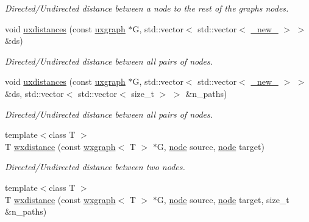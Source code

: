 \begin{DoxyCompactItemize}
\begin{DoxyCompactList}\small\item\em Directed/\+Undirected distance between a node to the rest of the graph\textquotesingle{}s nodes. \end{DoxyCompactList}\item 
void \hyperlink{namespacelgraph_1_1traversal_a401cf82c5e153e82a73f4be9d5d75288}{uxdistances} (const \hyperlink{classlgraph_1_1uxgraph}{uxgraph} $\ast$G, std\+::vector$<$ std\+::vector$<$ \hyperlink{namespacelgraph_a2836f966c1c36b43da337d8907728ec0}{\+\_\+new\+\_\+} $>$ $>$ \&ds)
\begin{DoxyCompactList}\small\item\em Directed/\+Undirected distance between all pairs of nodes. \end{DoxyCompactList}\item 
void \hyperlink{namespacelgraph_1_1traversal_ad372437fe4156af974637e9908a0f284}{uxdistances} (const \hyperlink{classlgraph_1_1uxgraph}{uxgraph} $\ast$G, std\+::vector$<$ std\+::vector$<$ \hyperlink{namespacelgraph_a2836f966c1c36b43da337d8907728ec0}{\+\_\+new\+\_\+} $>$ $>$ \&ds, std\+::vector$<$ std\+::vector$<$ size\+\_\+t $>$ $>$ \&n\+\_\+paths)
\begin{DoxyCompactList}\small\item\em Directed/\+Undirected distance between all pairs of nodes. \end{DoxyCompactList}\item 
{\footnotesize template$<$class T $>$ }\\T \hyperlink{namespacelgraph_1_1traversal_a6f7355bc246be223e074d737810f2fb4}{wxdistance} (const \hyperlink{classlgraph_1_1wxgraph}{wxgraph}$<$ T $>$ $\ast$G, \hyperlink{namespacelgraph_a397169dd66adf725210a30fb7251773e}{node} source, \hyperlink{namespacelgraph_a397169dd66adf725210a30fb7251773e}{node} target)
\begin{DoxyCompactList}\small\item\em Directed/\+Undirected distance between two nodes. \end{DoxyCompactList}\item 
{\footnotesize template$<$class T $>$ }\\T \hyperlink{namespacelgraph_1_1traversal_a39a6c5e2fa275d28c02051dbbd934e39}{wxdistance} (const \hyperlink{classlgraph_1_1wxgraph}{wxgraph}$<$ T $>$ $\ast$G, \hyperlink{namespacelgraph_a397169dd66adf725210a30fb7251773e}{node} source, \hyperlink{namespacelgraph_a397169dd66adf725210a30fb7251773e}{node} target, size\+\_\+t \&n\+\_\+paths)

\end{DoxyCompactItemize}
